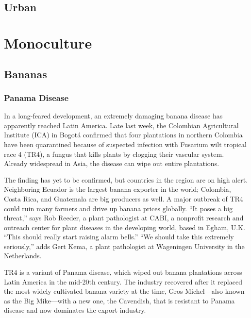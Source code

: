 \documentclass[
]{book}
\begin{document}
\hypertarget{urban}{%
\section{Urban}\label{urban}}

\hypertarget{monoculture}{%
\chapter{Monoculture}\label{monoculture}}

\hypertarget{bananas}{%
\section{Bananas}\label{bananas}}

\hypertarget{panama-disease}{%
\subsection{Panama Disease}\label{panama-disease}}

In a long-feared development, an extremely damaging banana disease has apparently reached Latin America. Late last week, the Colombian Agricultural Institute (ICA) in Bogotá confirmed that four plantations in northern Colombia have been quarantined because of suspected infection with Fusarium wilt tropical race 4 (TR4), a fungus that kills plants by clogging their vascular system. Already widespread in Asia, the disease can wipe out entire plantations.

The finding has yet to be confirmed, but countries in the region are on high alert. Neighboring Ecuador is the largest banana exporter in the world; Colombia, Costa Rica, and Guatemala are big producers as well. A major outbreak of TR4 could ruin many farmers and drive up banana prices globally. ``It poses a big threat,'' says Rob Reeder, a plant pathologist at CABI, a nonprofit research and outreach center for plant diseases in the developing world, based in Egham, U.K. ``This should really start raising alarm bells.'' ``We should take this extremely seriously,'' adds Gert Kema, a plant pathologist at Wageningen University in the Netherlands.

TR4 is a variant of Panama disease, which wiped out banana plantations across Latin America in the mid-20th century. The industry recovered after it replaced the most widely cultivated banana variety at the time, Gros Michel---also known as the Big Mike---with a new one, the Cavendish, that is resistant to Panama disease and now dominates the export industry.
\end{document}

